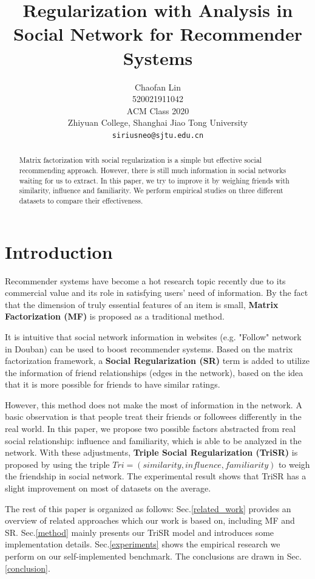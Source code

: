 \documentclass{article}
\title{Regularization with Analysis in Social Network for Recommender Systems}
\author{
  Chaofan Lin \\
    520021911042\\
    ACM Class 2020\\
    Zhiyuan College, Shanghai Jiao Tong University \\
  \texttt{siriusneo@sjtu.edu.cn} \\
}
\begin{document}
\maketitle

\begin{abstract}
  Matrix factorization with social regularization is a simple but effective social 
  recommending approach. However, there is still 
  much information in social networks
  waiting for us to extract.
  In this paper, we try to improve it 
  by weighing friends with similarity, influence and familiarity.
  We perform empirical studies 
  on three different datasets to compare their effectiveness.
\end{abstract}


\section{Introduction}

Recommender systems have become a hot research topic recently
due to its commercial value and its role in satisfying users'
need of information. By the fact that the dimension of truly essential features of an item is small, 
\textbf{Matrix Factorization (MF)} \cite{ko2009mf} is proposed as a traditional method.

It is intuitive that 
social network information in websites (e.g. "Follow" network in Douban) 
can be used to boost recommender systems. Based on the matrix factorization framework, 
a \textbf{Social Regularization (SR)} \cite{ma2011rsr} term is added to utilize the information of friend relationships 
(edges in the network), based on the idea that it is more possible for friends to 
have similar ratings.

However, this method does not make 
the most of information in the network. A basic observation is that people treat 
their friends or followees differently in the real world.
In this paper, we propose two possible factors abstracted from real social relationship:
influence and familiarity, which is able to be analyzed in the network. 
With these adjustments, \textbf{Triple Social Regularization (TriSR)} is proposed by using the triple 
$Tri = (similarity, influence, familiarity)$ 
to weigh the friendship in social network. The experimental result shows
that TriSR has a slight improvement on most of datasets on the average.

The rest of this paper is organized as follows: 
Sec.\ref{related_work} 
provides an overview of related approaches which our work is based on, including MF and SR.
Sec.\ref{method} mainly presents our TriSR model and 
introduces some implementation details. 
Sec.\ref{experiments} shows the empirical research we perform on our 
self-implemented benchmark. The conclusions are drawn in Sec.\ref{conclusion}. 
\end{document}

